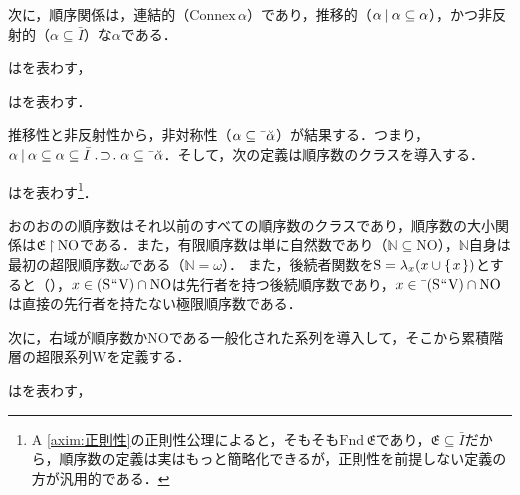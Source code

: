 \noindent 次に，順序関係は，連結的（$\mathrm{Connex}\,\alpha$）であり，推移的（$ \alpha\mathbin{\mid}\alpha\subseteq\alpha $），かつ非反射的（$\alpha\subseteq\bar{I}$）な$\alpha$である．

\begin{df}
\label{df:連結性}
はを表わす，
\end{df}

\begin{df}
\label{df:順序}
はを表わす．
\end{df}
\noindent 推移性と非反射性から，非対称性（$\alpha\subseteq\bar{\:\:}\breve{\alpha}$）が結果する．つまり，
$ \alpha\resl\alpha\subseteq\alpha\subseteq\bar{I}\case{1}{1}{1}\alpha\subseteq\barl{\breve{\alpha}} $．そして，次の定義は順序数のクラスを導入する．
\begin{df}
\label{df:順序数}
はを表わす\footnote{
    A \ref{axim:正則性}の正則性公理によると，そもそも$ \mathrm{Fnd}\,\mathfrak{E} $であり，$ \mathfrak{E}\subseteq\bar{I} $だから，順序数の定義は実はもっと簡略化できるが，正則性を前提しない定義の方が汎用的である．
}．
\end{df}

\noindent おのおのの順序数はそれ以前のすべての順序数のクラスであり，順序数の大小関係は$ \mathfrak{E}\mathbin{\upharpoonright}\mathrm{NO} $である．また，有限順序数は単に自然数であり（$ \mathbb{N}\subseteq\mathrm{NO} $），$\mathbb{N}$自身は最初の超限順序数$\omega$である（$\mathbb{N}=\omega$）．
また，後続者関数を$ \mathrm{S} = \lambda_x(x\cup\{\mspace{2mu}x\mspace{2mu}\}) $とすると（），$ x\in(\mathrm{S}{\mspace{1mu}{``}\mspace{1mu}}\mathrm{V})\cap\mathrm{NO} $は先行者を持つ後続順序数であり，$ x\in\bar{\:\:}(\mathrm{S}{\mspace{1mu}{``}\mspace{1mu}}\mathrm{V})\cap\mathrm{NO} $は直接の先行者を持たない極限順序数である．

次に，右域が順序数か$ \mathrm{NO} $である一般化された系列を導入して，そこから累積階層の超限系列$\mathrm{W}$を定義する．
\begin{df}
\label{df:超限系列}
\kagi{$
    \seq\alpha
$}はを表わす，
\end{df}

